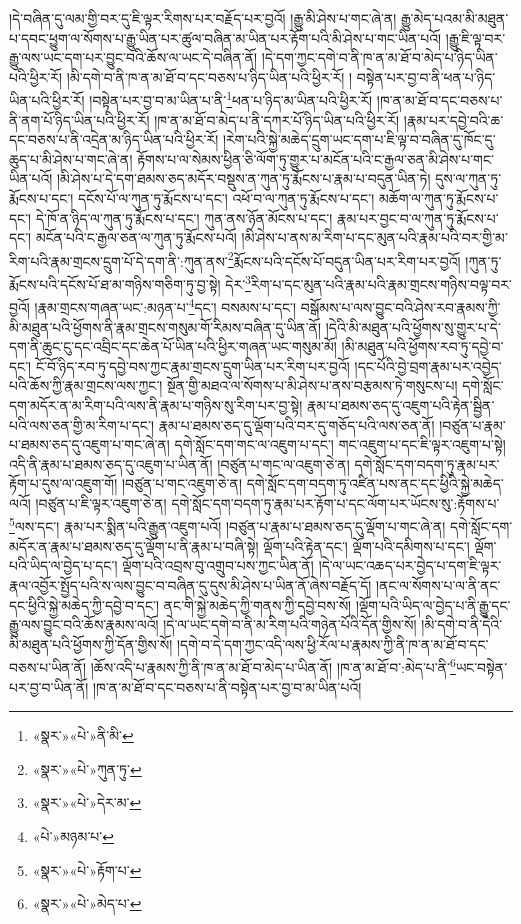 །དེ་བཞིན་དུ་ལམ་གྱི་བར་དུ་ཇི་ལྟར་རིགས་པར་བརྗོད་པར་བྱའོ། །རྒྱུ་མི་ཤེས་པ་གང་ཞེ་ན། རྒྱུ་མེད་པའམ་མི་མཐུན་པ་དབང་ཕྱུག་ལ་སོགས་པ་རྒྱུ་ཡིན་པར་ཚུལ་བཞིན་མ་ཡིན་པར་རྟོག་པའི་མི་ཤེས་པ་གང་ཡིན་པའོ། །རྒྱུ་ཇི་ལྟ་བར་རྒྱུ་ལས་ཡང་དག་པར་བྱུང་བའི་ཆོས་ལ་ཡང་དེ་བཞིན་ནོ། །དེ་དག་ཀྱང་དགེ་བ་ནི་ཁ་ན་མ་ཐོ་བ་མེད་པ་ཉིད་ཡིན་པའི་ཕྱིར་རོ། །མི་དགེ་བ་ནི་ཁ་ན་མ་ཐོ་བ་དང་བཅས་པ་ཉིད་ཡིན་པའི་ཕྱིར་རོ། །
བསྟེན་པར་བྱ་བ་ནི་ཕན་པ་ཉིད་ཡིན་པའི་ཕྱིར་རོ། །བསྟེན་པར་བྱ་བ་མ་ཡིན་པ་ནི་\footnote{«སྣར་»«པེ་»ནི་མི་}ཕན་པ་ཉིད་མ་ཡིན་པའི་ཕྱིར་རོ། །ཁ་ན་མ་ཐོ་བ་དང་བཅས་པ་ནི་ནག་པོ་ཉིད་ཡིན་པའི་ཕྱིར་རོ། །ཁ་ན་མ་ཐོ་བ་མེད་པ་ནི་དཀར་པོ་ཉིད་ཡིན་པའི་ཕྱིར་རོ། །རྣམ་པར་དབྱེ་བའི་ཆ་དང་བཅས་པ་ནི་འདྲེན་མ་ཉིད་ཡིན་པའི་ཕྱིར་རོ། །རེག་པའི་སྐྱེ་མཆེད་དྲུག་ཡང་དག་པ་ཇི་ལྟ་བ་བཞིན་དུ་ཁོང་དུ་ཆུད་པ་མི་ཤེས་པ་གང་ཞེ་ན། རྟོགས་པ་ལ་སེམས་ཕྱིན་ཅི་ལོག་ཏུ་གྱུར་པ་མངོན་པའི་ང་རྒྱལ་ཅན་མི་ཤེས་པ་གང་ཡིན་པའོ། །མི་ཤེས་པ་དེ་དག་ཐམས་ཅད་མདོར་བསྡུས་ན་ཀུན་ཏུ་རྨོངས་པ་རྣམ་པ་བདུན་ཡིན་ཏེ། དུས་ལ་ཀུན་ཏུ་རྨོངས་པ་དང་། དངོས་པོ་ལ་ཀུན་ཏུ་རྨོངས་པ་དང་། འཕོ་བ་ལ་ཀུན་ཏུ་རྨོངས་པ་དང་། མཆོག་ལ་ཀུན་ཏུ་རྨོངས་པ་དང་། དེ་ཁོ་ན་ཉིད་ལ་ཀུན་ཏུ་རྨོངས་པ་དང་། ཀུན་ནས་ཉོན་མོངས་པ་དང་། རྣམ་པར་བྱང་བ་ལ་ཀུན་ཏུ་རྨོངས་པ་དང་། མངོན་པའི་ང་རྒྱལ་ཅན་ལ་ཀུན་ཏུ་རྨོངས་པའོ། །མི་ཤེས་པ་ནས་མ་རིག་པ་དང་མུན་པའི་རྣམ་པའི་བར་གྱི་མ་རིག་པའི་རྣམ་གྲངས་དྲུག་པོ་དེ་དག་ནི་:ཀུན་ནས་\footnote{«སྣར་»«པེ་»ཀུན་ཏུ་}རྨོངས་པའི་དངོས་པོ་བདུན་ཡིན་པར་རིག་པར་བྱའོ། །ཀུན་ཏུ་རྨོངས་པའི་དངོས་པོ་ཐ་མ་གཉིས་གཅིག་ཏུ་བྱ་སྟེ། དེར་\footnote{«སྣར་»«པེ་»དེར་མ་}རིག་པ་དང་མུན་པའི་རྣམ་པའི་རྣམ་གྲངས་གཉིས་བལྟ་བར་བྱའོ། །རྣམ་གྲངས་གཞན་ཡང་:མཉན་པ་\footnote{«པེ་»མཉམ་པ་}དང་། བསམས་པ་དང་། བསྒོམས་པ་ལས་བྱུང་བའི་ཤེས་རབ་རྣམས་ཀྱི་མི་མཐུན་པའི་ཕྱོགས་ནི་རྣམ་གྲངས་གསུམ་གོ་རིམས་བཞིན་དུ་ཡིན་ནོ། །དེའི་མི་མཐུན་པའི་ཕྱོགས་སུ་གྱུར་པ་དེ་དག་ནི་ཆུང་ངུ་དང་འབྲིང་དང་ཆེན་པོ་ཡིན་པའི་ཕྱིར་གཞན་ཡང་གསུམ་མོ། །མི་མཐུན་པའི་ཕྱོགས་རབ་ཏུ་དབྱེ་བ་དང་། ངོ་བོ་ཉིད་རབ་ཏུ་དབྱེ་བས་ཀྱང་རྣམ་གྲངས་དྲུག་ཡིན་པར་རིག་པར་བྱའོ། །དང་པོའི་བྱེ་བྲག་རྣམ་པར་འབྱེད་པའི་ཆོས་ཀྱི་རྣམ་གྲངས་ལས་ཀྱང་། སྔོན་གྱི་མཐའ་ལ་སོགས་པ་མི་ཤེས་པ་ནས་བརྩམས་ཏེ་གསུངས་པ། དགེ་སློང་དག་མདོར་ན་མ་རིག་པའི་ལས་ནི་རྣམ་པ་གཉིས་སུ་རིག་པར་བྱ་སྟེ། རྣམ་པ་ཐམས་ཅད་དུ་འཇུག་པའི་རྟེན་སྦྱིན་པའི་ལས་ཅན་གྱི་མ་རིག་པ་དང་། རྣམ་པ་ཐམས་ཅད་དུ་ལྡོག་པའི་བར་དུ་གཅོད་པའི་ལས་ཅན་ནོ། །བཙུན་པ་རྣམ་པ་ཐམས་ཅད་དུ་འཇུག་པ་གང་ཞེ་ན། དགེ་སློང་དག་གང་ལ་འཇུག་པ་དང་། གང་འཇུག་པ་དང་ཇི་ལྟར་འཇུག་པ་སྟེ། འདི་ནི་རྣམ་པ་ཐམས་ཅད་དུ་འཇུག་པ་ཡིན་ནོ། །བཙུན་པ་གང་ལ་འཇུག་ཅེ་ན། དགེ་སློང་དག་བདག་ཏུ་རྣམ་པར་རྟོག་པ་དུས་ལ་འཇུག་གོ། །བཙུན་པ་གང་འཇུག་ཅེ་ན། དགེ་སློང་དག་བདག་ཏུ་འཛིན་པས་ནང་དང་ཕྱིའི་སྐྱེ་མཆེད་ལའོ། །བཙུན་པ་ཇི་ལྟར་འཇུག་ཅེ་ན། དགེ་སློང་དག་བདག་ཏུ་རྣམ་པར་རྟོག་པ་དང་ལོག་པར་ཡོངས་སུ་:རྟོགས་པ་\footnote{«སྣར་»«པེ་»རྟོག་པ་}ལས་དང་། རྣམ་པར་སྨིན་པའི་རྒྱུན་འཇུག་པའོ། །བཙུན་པ་རྣམ་པ་ཐམས་ཅད་དུ་ལྡོག་པ་གང་ཞེ་ན། དགེ་སློང་དག་མདོར་ན་རྣམ་པ་ཐམས་ཅད་དུ་ལྡོག་པ་ནི་རྣམ་པ་བཞི་སྟེ། ལྡོག་པའི་རྟེན་དང་། ལྡོག་པའི་དམིགས་པ་དང་། ལྡོག་པའི་ཡིད་ལ་བྱེད་པ་དང་། ལྡོག་པའི་འབྲས་བུ་འགྲུབ་པས་ཀྱང་ཡིན་ནོ། །དེ་ལ་ཡང་འཆད་པར་བྱེད་པ་དག་ཇི་ལྟར་རྣལ་འབྱོར་སྤྱོད་པའི་ས་ལས་བྱུང་བ་བཞིན་དུ་དུས་མི་ཤེས་པ་ཡིན་ནོ་ཞེས་བརྗོད་དོ། །ནང་ལ་སོགས་པ་ལ་ནི་ནང་དང་ཕྱིའི་སྐྱེ་མཆེད་ཀྱི་དབྱེ་བ་དང་། ནང་གི་སྐྱེ་མཆེད་ཀྱི་གནས་ཀྱི་དབྱེ་བས་སོ། །ལྡོག་པའི་ཡིད་ལ་བྱེད་པ་ནི་རྒྱུ་དང་རྒྱུ་ལས་བྱུང་བའི་ཆོས་རྣམས་ལའོ། །དེ་ལ་ཡང་དགེ་བ་ནི་མ་རིག་པའི་གཉེན་པོའི་དོན་གྱིས་སོ། །མི་དགེ་བ་ནི་དེའི་མི་མཐུན་པའི་ཕྱོགས་ཀྱི་དོན་གྱིས་སོ། །དགེ་བ་དེ་དག་ཀྱང་འདི་ལས་ཕྱི་རོལ་པ་རྣམས་ཀྱི་ནི་ཁ་ན་མ་ཐོ་བ་དང་བཅས་པ་ཡིན་ནོ། །ཆོས་འདི་པ་རྣམས་ཀྱི་ནི་ཁ་ན་མ་ཐོ་བ་མེད་པ་ཡིན་ནོ། །ཁ་ན་མ་ཐོ་བ་:མེད་པ་ནི་\footnote{«སྣར་»«པེ་»མེད་པ་}ཡང་བསྟེན་པར་བྱ་བ་ཡིན་ནོ། །ཁ་ན་མ་ཐོ་བ་དང་བཅས་པ་ནི་བསྟེན་པར་བྱ་བ་མ་ཡིན་པའོ། 